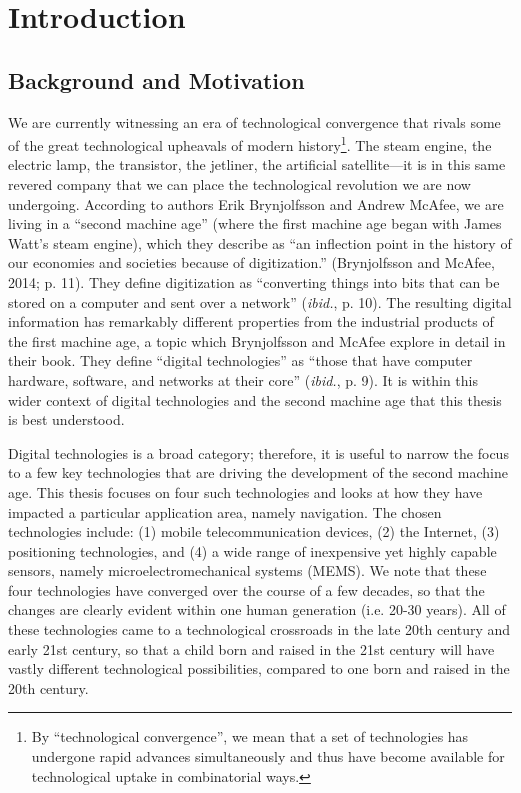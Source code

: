 \chapter{Introduction}
\label{ch:intro}

\section{Background and Motivation}
\label{sec:motivation}
We are currently witnessing an era of technological convergence that rivals some of the great technological upheavals of modern history\footnote{By ``technological convergence'', we mean that a set of technologies has undergone rapid advances simultaneously and thus have become available for technological uptake in combinatorial ways.}. The steam engine, the electric lamp, the transistor, the jetliner, the artificial satellite---it is in this same revered company that we can place the technological revolution we are now undergoing. According to authors Erik Brynjolfsson and Andrew McAfee, we are living in a ``second machine age'' (where the first machine age began with James Watt's steam engine), which they describe as ``an inflection point in the history of our economies and societies because of digitization.'' (Brynjolfsson and McAfee, 2014; p. 11). They define digitization as ``converting things into bits that can be stored on a computer and sent over a network'' (\emph{ibid.}, p. 10). The resulting digital information has remarkably different properties from the industrial products of the first machine age, a topic which Brynjolfsson and McAfee explore in detail in their book. They define ``digital technologies'' as ``those that have computer hardware, software, and networks at their core'' (\emph{ibid.}, p. 9). It is within this wider context of digital technologies and the second machine age that this thesis is best understood.

Digital technologies is a broad category; therefore, it is useful to narrow the focus to a few key technologies that are driving the development of the second machine age. This thesis focuses on four such technologies and looks at how they have impacted a particular application area, namely navigation. The chosen technologies include: (1) mobile telecommunication devices, (2) the Internet, (3) positioning technologies, and (4) a wide range of inexpensive yet highly capable sensors, namely microelectromechanical systems (MEMS). We note that these four technologies have converged over the course of a few decades, so that the changes are clearly evident within one human generation (i.e. 20-30 years). All of these technologies came to a technological crossroads in the late 20th century and early 21st century, so that a child born and raised in the 21st century will have vastly different technological possibilities, compared to one born and raised in the 20th century.

